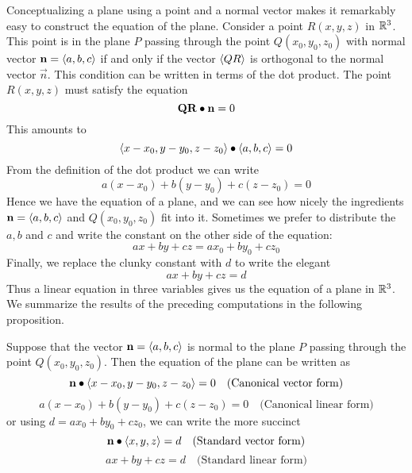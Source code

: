 \documentclass[handout]{ximera}
\begin{document}
Conceptualizing a plane using a point and a normal vector makes it remarkably easy to construct the equation of the plane.
Consider a point $R(x, y, z)$ in $\mathbb R^3$.
This point is in the plane $P$ passing through the point $Q(x_0, y_0, z_0)$ with normal vector $\mathbf{n} =\left\langle a, b, c\right\rangle$
if and only if the vector $\left\langle QR\right\rangle$ is orthogonal to the normal vector $\vec{n}$.
This condition can be written in terms of the dot product.
The point $R(x, y, z)$ must satisfy the equation
\[
\mathbf{QR} \bullet \mathbf{n} = 0
\]
This amounts to 
\[
\left\langle x - x_0, y-y_0, z-z_0\right\rangle \bullet \left\langle a, b, c\right\rangle = 0
\]
From the definition of the dot product we can write
\[
a(x-x_0) + b(y-y_0) + c(z-z_0) = 0
\]
Hence we have the equation of a plane, and we can see how nicely the ingredients $\mathbf{n} = \left\langle a,b,c\right\rangle$
and $Q(x_0, y_0, z_0)$ fit into it.
Sometimes we prefer to distribute the $a, b$ and $c$ and write the constant on the other side of the equation:
\[
ax + by + cz = ax_0 + by_0 + cz_0
\]
Finally, we replace the clunky constant with $d$ to write the elegant
\[
ax + by + cz = d
\]
Thus a linear equation in three variables gives us the equation of a plane in $\mathbb R^3$.
We summarize the results of the preceding computations in the following proposition.
\begin{proposition}
Suppose that the vector $\mathbf{n} = \left\langle a,b,c\right\rangle$ is normal to the plane $P$ passing through the point $Q(x_0, y_0, z_0)$.
Then the equation of the plane can be written as
\[
\mathbf{n} \bullet \left\langle x-x_0, y-y_0, z-z_0\right\rangle = 0 \quad \text{(Canonical vector form)}
\]
\[
a(x-x_0) + b(y-y_0) + c(z-z_0) = 0 \quad \text{(Canonical linear form)}
\]
or using $d = ax_0 + by_0 + cz_0$,  we can write the more succinct
\[
\mathbf{n} \bullet \left\langle x, y, z\right\rangle = d \quad \text{(Standard vector form)}
\]
\[
ax+by+cz = d \quad \text{(Standard linear form)}
\]
\end{proposition}
\end{document}
